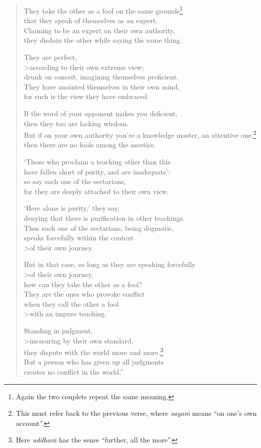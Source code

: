 \documentclass[12pt,openany]{book}%
\begin{document}
\begin{verse}
They take the other as a fool on the same grounds\footnote{Again the two couplets repeat the same meaning. } \\
that they speak of themselves as an expert. \\
Claiming to be an expert on their own authority, \\
they disdain the other while saying the same thing. 

They are perfect, \\>according to their own extreme view; \\
drunk on conceit, imagining themselves proficient. \\
They have anointed themselves in their own mind, \\
for such is the view they have embraced. 

If the word of your opponent makes you deficient, \\
then they too are lacking wisdom. \\
But if on your own authority you’re a knowledge master, an attentive one,\footnote{This must refer back to the previous verse, where \textit{\textsanskrit{sayaṁ}} means “on one’s own account”. } \\
then there are no fools among the ascetics. 

‘Those who proclaim a teaching other than this \\
have fallen short of purity, and are inadequate’: \\
so say each one of the sectarians, \\
for they are deeply attached to their own view. 

‘Here alone is purity,’ they say, \\
denying that there is purification in other teachings. \\
Thus each one of the sectarians, being dogmatic, \\
speaks forcefully within the context \\>of their own journey. 

But in that case, so long as they are speaking forcefully \\>of their own journey, \\
how can they take the other as a fool? \\
They are the ones who provoke conflict \\
when they call the other a fool \\>with an impure teaching. 

Standing in judgment, \\>measuring by their own standard, \\
they dispute with the world more and more.\footnote{Here \textit{\textsanskrit{uddhaṁ}} has the sense “further, all the more”. } \\
But a person who has given up all judgments \\
creates no conflict in the world.” 

%
\end{verse}
\end{document}

